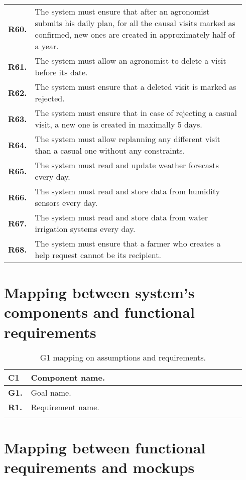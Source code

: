 \begin{longtable}{@{}p{0.06\linewidth} p{0.88\linewidth}}
	\textbf{R60.} & The system must ensure that after an agronomist submits his daily plan, for all the causal visits marked as confirmed, new ones are created in approximately half of a year.\\
	\textbf{R61.} & The system must allow an agronomist to delete a visit before its date.\\
	\textbf{R62.} & The system must ensure that a deleted visit is marked as rejected.\\
	\textbf{R63.} & The system must ensure that in case of rejecting a casual visit, a new one is created in maximally 5 days.\\
	\textbf{R64.} & The system must allow replanning any different visit than a casual one without any constraints.\\
	
	\textbf{R65.} & The system must read and update weather forecasts every day. \\
	\textbf{R66.} & The system must read and store data from humidity sensors every day. \\
	\textbf{R67.} & The system must read and store data from water irrigation systems every day. \\
	\textbf{R68.} & The system must ensure that a farmer who creates a help request cannot be its recipient.\\
		
	\bottomrule
\end{longtable}

\section{Mapping between system's components and functional requirements}

\begin{longtable}{p{0.06\linewidth} p{0.88\linewidth}} 
    \toprule
    \textbf{C1} & Component name.\\
    \midrule
    \textbf{G1.} & Goal name.\\
    \midrule		
    \textbf{R1.} & Requirement name.\\	
    \bottomrule
    \caption{G1 mapping on assumptions and requirements.}
\end{longtable}


\section{Mapping between functional requirements and mockups}

